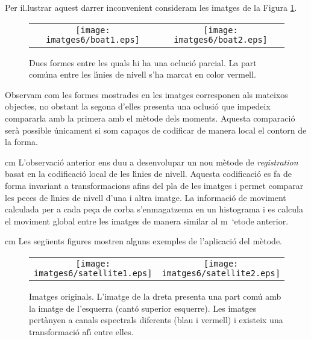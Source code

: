 \documentclass{article}
\begin{document}
\noindent
Per il.lustrar aquest darrer inconvenient consideram les imatges de la Figura \ref{ex_oclusio}.

\begin{figure}[htbp]
\begin{center}
\begin{tabular}{cc}
\texttt{[image: imatges6/boat1.eps]} &
\texttt{[image: imatges6/boat2.eps]}
\end{tabular}
\end{center}
\caption{Dues formes entre les quals hi ha una ocluci\'o parcial. La part com\'una entre les l\'\i nies de nivell
s'ha marcat en color vermell.}
\label{ex_oclusio}
\end{figure}

\noindent
Observam com les formes mostrades en les imatges corresponen als mateixos objectes, no obstant la segona
d'elles presenta una oclusi\'o que impedeix compararla amb la primera amb el m\`etode dels moments.
Aquesta comparaci\'o ser\`a possible \'unicament si som capa\c{c}os de codificar de manera local el
contorn de la forma.


 cm
L'observaci\'o anterior ens duu a desenvolupar un nou m\`etode de {\it registration} basat en la codificaci\'o local de
les l\'\i nies de nivell. Aquesta codificaci\'o es fa de forma invariant a transformacions afins del pla 
de les imatges i permet comparar les peces de l\'\i nies de nivell d'una i altra imatge. La informaci\'o de
moviment calculada per a cada pe\c{c}a de corba s'enmagatzema en un histograma i es calcula el moviment global entre
les imatges de manera similar al m\ `etode anterior.

 cm  
\noindent
Les seg\"uents figures mostren alguns exemples de l'aplicaci\'o del m\`etode.

\begin{figure}[htbp]
\begin{center}
\begin{tabular}{cc}
\texttt{[image: imatges6/satellite1.eps]} &
\texttt{[image: imatges6/satellite2.eps]}
\end{tabular}
\end{center}
\caption{Imatges originals. L'imatge de la dreta presenta una part com\'u amb la imatge de l'esquerra (cant\'o
superior esquerre). Les imatges pert\`anyen a canals espectrals diferents (blau i vermell) i existeix una
transformaci\'o af\'\i  $ $ entre elles.}
\end{figure}
\end{document}
